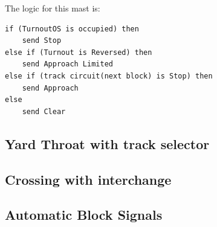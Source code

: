 \documentclass[12pt,twoside]{article}
\begin{document}
The logic for this mast is:

\begin{verbatim}
if (TurnoutOS is occupied) then
    send Stop
else if (Turnout is Reversed) then
    send Approach Limited
else if (track circuit(next block) is Stop) then
    send Approach
else
    send Clear
\end{verbatim}


\clearpage
\subsection{Yard Throat with track selector}
\label{sect-appl:yardthroat}

\subsection{Crossing with interchange}
\label{sect-appl:crossinginterchange}

\subsection{Automatic Block Signals}
\label{sect-appl:ABS}
\end{document}
